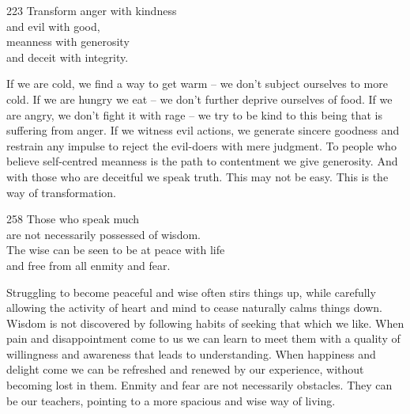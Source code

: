 
\begin{dhpVerse}{223}
\label{dhp-223}
Transform anger with kindness\\
and evil with good,\\
meanness with generosity\\
and deceit with integrity.
\end{dhpVerse}

\begin{dhpRefl}

If we are cold, we find a way to get warm -- we don't subject
ourselves to more cold. If we are hungry we eat -- we don't further
deprive ourselves of food. If we are angry, we don't fight it with
rage -- we try to be kind to this being that is suffering from anger.
If we witness evil actions, we generate sincere goodness and restrain
any impulse to reject the evil-doers with mere judgment. To people
who believe self-centred meanness is the path to contentment we give
generosity. And with those who are deceitful we speak truth. This may
not be easy. This is the way of transformation.

\end{dhpRefl}


\begin{dhpVerse}{258}
\label{dhp-258}
Those who speak much\\
are not necessarily possessed of wisdom.\\
The wise can be seen to be at peace with life\\
and free from all enmity and fear.
\end{dhpVerse}

\begin{dhpRefl}

Struggling to become peaceful and wise often stirs things up, while
carefully allowing the activity of heart and mind to cease naturally
calms things down. Wisdom is not discovered by following habits of
seeking that which we like. When pain and disappointment come to us
we can learn to meet them with a quality of willingness and awareness
that leads to understanding. When happiness and delight come we can
be refreshed and renewed by our experience, without becoming lost in
them. Enmity and fear are not necessarily obstacles. They can be our
teachers, pointing to a more spacious and wise way of living.

\end{dhpRefl}

